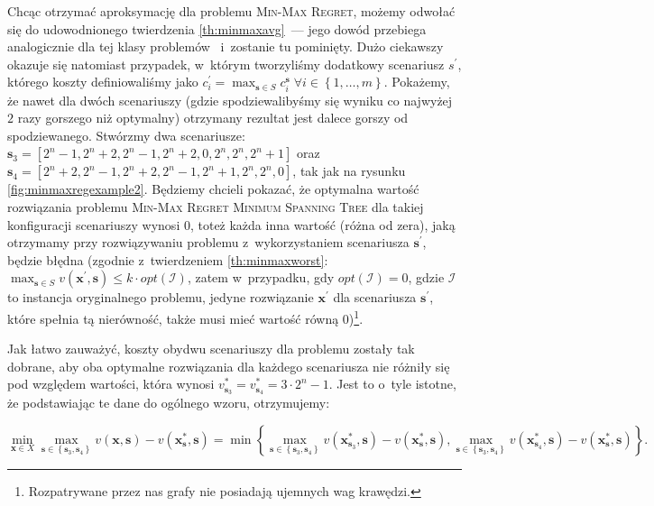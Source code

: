 Chcąc otrzymać aproksymację dla problemu \textsc{Min-Max Regret}, możemy odwołać się do udowodnionego twierdzenia \ref{th:minmaxavg}~--- jego dowód przebiega analogicznie dla tej klasy problemów~\cite[propozycja $1$]{minmaxSurvey} i~zostanie tu pominięty.
Dużo ciekawszy okazuje się natomiast przypadek, w~którym tworzyliśmy dodatkowy scenariusz $s^{\prime}$, którego koszty definiowaliśmy jako $c^{\prime}_{i} = \max_{\textbf{s} \in S} c^{\textbf{s}}_{i} \; \forall i \in \left\{ 1, \dots, m \right\}$.
Pokażemy, że nawet dla dwóch scenariuszy (gdzie spodziewalibyśmy się wyniku co najwyżej $2$ razy gorszego niż optymalny) otrzymany rezultat jest dalece gorszy od spodziewanego.
Stwórzmy dwa scenariusze: $\textbf{s}_{3} = \left[ 2^{n} - 1, 2^{n} + 2, 2^{n} - 1, 2^{n} + 2, 0, 2^{n}, 2^{n}, 2^{n} + 1 \right]$ oraz $\textbf{s}_{4} = \left[ 2^{n} + 2, 2^{n} - 1, 2^{n} + 2, 2^{n} - 1, 2^{n} + 1, 2^{n}, 2^{n}, 0 \right]$, tak jak na rysunku \ref{fig:minmaxregexample2}.
Będziemy chcieli pokazać, że optymalna wartość rozwiązania problemu \textsc{Min-Max Regret Minimum Spanning Tree} dla takiej konfiguracji scenariuszy wynosi $0$, toteż każda inna wartość (różna od zera), jaką otrzymamy przy rozwiązywaniu problemu z~wykorzystaniem scenariusza $\textbf{s}^{\prime}$, będzie błędna (zgodnie z~twierdzeniem \ref{th:minmaxworst}: $\max_{\textbf{s} \in S} v \left( \textbf{x}^{\prime}, \textbf{s} \right) \leqslant k \cdot opt \left( \mathcal{I} \right)$, zatem w~przypadku, gdy $opt \left( \mathcal{I} \right) = 0$, gdzie $\mathcal{I}$ to instancja oryginalnego problemu, jedyne rozwiązanie $\textbf{x}^{\prime}$ dla scenariusza $\textbf{s}^{\prime}$, które spełnia tą nierówność, także musi mieć wartość równą $0$)\footnote{
	Rozpatrywane przez nas grafy nie posiadają ujemnych wag krawędzi.
}. 

Jak łatwo zauważyć, koszty obydwu scenariuszy dla problemu zostały tak dobrane, aby oba optymalne rozwiązania dla każdego scenariusza nie różniły się pod względem wartości, która wynosi $v^{\ast}_{\textbf{s}_{3}} = v^{\ast}_{\textbf{s}_{4}} = 3 \cdot 2^{n} - 1$.
Jest to o~tyle istotne, że podstawiając te dane do ogólnego wzoru, otrzymujemy:

\begin{equation}\label{eq:minmaxreg}
	\min_{\textbf{x} \in X} \max_{\textbf{s} \in \left\{ \textbf{s}_{3}, \textbf{s}_{4} \right\}} v \left( \textbf{x}, \textbf{s} \right) - v \left( \textbf{x}^{\ast}_{\textbf{s}}, \textbf{s} \right) = \min \left\{   \max_{\textbf{s} \in \left\{ \textbf{s}_{3}, \textbf{s}_{4} \right\}} v \left( \textbf{x}^{\ast}_{\textbf{s}_{3}}, \textbf{s} \right) - v \left( \textbf{x}^{\ast}_{\textbf{s}}, \textbf{s} \right), \max_{\textbf{s} \in \left\{ \textbf{s}_{3}, \textbf{s}_{4} \right\}} v \left( \textbf{x}^{\ast}_{\textbf{s}_{4}}, \textbf{s} \right) - v \left( \textbf{x}^{\ast}_{\textbf{s}}, \textbf{s} \right) \right\}\text{.}
\end{equation}

